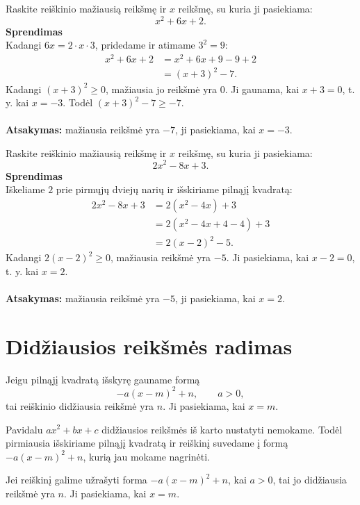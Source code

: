 \documentclass[11pt,a4paper]{scrartcl}
\begin{document}
\begin{example}
Raskite reiškinio mažiausią reikšmę ir $x$ reikšmę, su kuria ji pasiekiama:
\[
x^2+6x+2.
\]
\textbf{Sprendimas}\\
Kadangi $6x=2\cdot x\cdot3$, pridedame ir atimame $3^2=9$:
\[
\begin{aligned}
x^2+6x+2
&=x^2+6x+9-9+2\\
&=(x+3)^2-7.
\end{aligned}
\]
Kadangi $(x+3)^2\geq0$, mažiausia jo reikšmė yra $0$. Ji gaunama, kai $x+3=0$, t. y. kai $x=-3$. Todėl $(x+3)^2-7\geq-7$.\\ \\
\textbf{Atsakymas:} mažiausia reikšmė yra $-7$, ji pasiekiama, kai $x=-3$.
\end{example}

\begin{example}
Raskite reiškinio mažiausią reikšmę ir $x$ reikšmę, su kuria ji pasiekiama:
\[
2x^2-8x+3.
\]
\textbf{Sprendimas}\\
Iškeliame $2$ prie pirmųjų dviejų narių ir išskiriame pilnąjį kvadratą:
\[
\begin{aligned}
2x^2-8x+3
&=2(x^2-4x)+3\\
&=2(x^2-4x+4-4)+3\\
&=2(x-2)^2-5.
\end{aligned}
\]
Kadangi $2(x-2)^2\geq0$, mažiausia reikšmė yra $-5$. Ji pasiekiama, kai $x-2=0$, t. y. kai $x=2$.\\ \\
\textbf{Atsakymas:} mažiausia reikšmė yra $-5$, ji pasiekiama, kai $x=2$.
\end{example}

\section{Didžiausios reikšmės radimas}

Jeigu pilnąjį kvadratą išskyrę gauname formą
\[
-a(x-m)^2+n, \qquad a>0,
\]
tai reiškinio didžiausia reikšmė yra $n$. Ji pasiekiama, kai $x=m$.

Pavidalu $ax^2+bx+c$ didžiausios reikšmės iš karto nustatyti nemokame. Todėl pirmiausia išskiriame pilnąjį kvadratą ir reiškinį suvedame į formą $-a(x-m)^2+n$, kurią jau mokame nagrinėti.

\begin{property}
Jei reiškinį galime užrašyti forma $-a(x-m)^2+n$, kai $a>0$, tai jo didžiausia reikšmė yra $n$. Ji pasiekiama, kai $x=m$.
\end{property}
\end{document}
